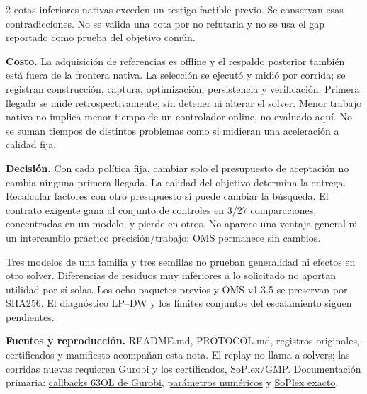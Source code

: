 \documentclass[11pt,a4paper]{article}
\begin{document}
2 cotas inferiores nativas exceden un testigo factible previo. Se
conservan esas contradicciones. No se valida una cota por no refutarla y no se
usa el gap reportado como prueba del objetivo común.

\textbf{Costo.} La adquisición de referencias es offline y el respaldo posterior
también está fuera de la frontera nativa. La selección se ejecutó y midió por
corrida; se registran construcción, captura, optimización, persistencia y
verificación. Primera llegada se mide retrospectivamente, sin detener ni
alterar el solver. Menor trabajo nativo no implica menor tiempo de un controlador
online, no evaluado aquí. No se suman tiempos de distintos problemas como si
midieran una aceleración a calidad fija.

\textbf{Decisión.} Con cada política fija, cambiar solo el presupuesto de aceptación no cambia ninguna primera llegada. La calidad del objetivo determina la entrega. Recalcular factores con otro presupuesto sí puede cambiar la búsqueda. El contrato exigente gana al conjunto de controles en 3/27 comparaciones, concentradas en un modelo, y pierde en otros. No aparece una ventaja general ni un intercambio práctico precisión/trabajo; OMS permanece sin cambios.

Tres modelos de una familia y tres semillas no prueban generalidad ni efectos
en otro solver. Diferencias de residuos muy inferiores a lo solicitado no
aportan utilidad por sí solas. Los ocho paquetes previos y OMS v1.3.5 se
preservan por SHA256. El diagnóstico LP--DW y los límites conjuntos del
escalamiento siguen pendientes.

\textbf{Fuentes y reproducción.} README.md, PROTOCOL.md, registros originales,
certificados y manifiesto acompañan esta nota. El replay no llama a solvers;
las corridas nuevas requieren Gurobi y los certificados, SoPlex/GMP.
Documentación primaria: \href{https://docs.gurobi.com/projects/optimizer/en/current/reference/numericcodes/callbacks.html}{callbacks 63OL de Gurobi},
\href{https://docs.gurobi.com/projects/optimizer/en/current/concepts/numericguide/numeric_parameters.html}{parámetros numéricos}
y \href{https://soplex.zib.de/doc/html/EXACT.php}{SoPlex exacto}.
\end{document}

